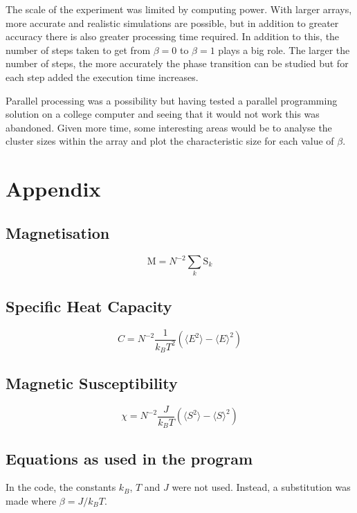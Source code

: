 \documentclass[11pt]{article}
\newcommand{\mathbold}[1]{\boldsymbol{\mathrm{#1}}}
\begin{document}
The scale of the experiment was limited by computing power. With larger arrays, more accurate and realistic simulations are possible, but in addition to greater accuracy there is also greater processing time required. In addition to this, the number of steps taken to get from $\beta=0$ to $\beta=1$ plays a big role. The larger the number of steps, the more accurately the phase transition can be studied but for each step added the execution time increases.

Parallel processing was a possibility but having tested a parallel programming solution on a college computer and seeing that it would not work this was abandoned. Given more time, some interesting areas would be to analyse the cluster sizes within the array and plot the characteristic size for each value of $\beta$.




\section*{Appendix}
\subsection*{Magnetisation}
\begin{equation} \label{eq:M}
\mathbold{M} = N^{-2}\sum_{k}\mathbold{S}_{k}
\end{equation}
\subsection*{Specific Heat Capacity}
\begin{equation}\label{eq:C}
C = N^{-2}\frac{1}{k_{B}T^{2}}\left(\langle E^{2}\rangle - \langle E\rangle ^{2}\right)
\end{equation}
\subsection*{Magnetic Susceptibility}
\begin{equation}\label{eq:Chi}
\chi = N^{-2}\frac{J}{k_{B}T}\left(\langle S^{2}\rangle - \langle S \rangle ^{2}\right)
\end{equation}
\subsection*{Equations as used in the program}
In the code, the constants $k_{B}$, $T$ and $J$ were not used. Instead, a substitution was made where $\beta = J/k_{B}T$.
\end{document}
